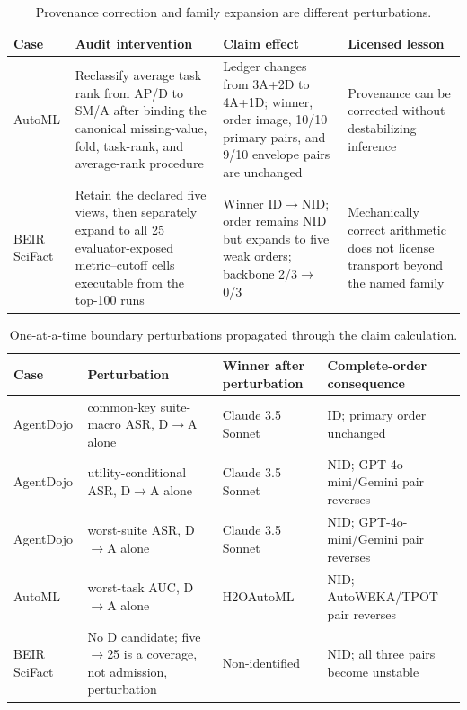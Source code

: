 \begin{table}[ht]
\centering
\caption{Provenance correction and family expansion are different perturbations.}
\label{tab:automl-beir-contrast}
\footnotesize
\begin{tabularx}{\linewidth}{@{}p{.13\linewidth}p{.31\linewidth}p{.25\linewidth}Y@{}}
\toprule Case & Audit intervention & Claim effect & Licensed lesson \\
\midrule
AutoML & Reclassify average task rank from AP/D to SM/A after binding the canonical missing-value, fold, task-rank, and average-rank procedure & Ledger changes from 3A+2D to 4A+1D; winner, order image, 10/10 primary pairs, and 9/10 envelope pairs are unchanged & Provenance can be corrected without destabilizing inference \\
BEIR SciFact & Retain the declared five views, then separately expand to all 25 evaluator-exposed metric--cutoff cells executable from the top-100 runs & Winner ID\(\to\)NID; order remains NID but expands to five weak orders; backbone 2/3\(\to\)0/3 & Mechanically correct arithmetic does not license transport beyond the named family \\
\bottomrule
\end{tabularx}
\end{table}

\begin{table}[ht]
\centering
\caption{One-at-a-time boundary perturbations propagated through the claim calculation.}
\label{tab:admission-perturbations}
\footnotesize
\begin{tabularx}{\linewidth}{@{}p{.15\linewidth}p{.31\linewidth}p{.18\linewidth}Y@{}}
\toprule Case & Perturbation & Winner after perturbation & Complete-order consequence \\
\midrule
AgentDojo & common-key suite-macro ASR, D\(\to\)A alone & Claude 3.5 Sonnet & ID; primary order unchanged \\
AgentDojo & utility-conditional ASR, D\(\to\)A alone & Claude 3.5 Sonnet & NID; GPT-4o-mini/Gemini pair reverses \\
AgentDojo & worst-suite ASR, D\(\to\)A alone & Claude 3.5 Sonnet & NID; GPT-4o-mini/Gemini pair reverses \\
AutoML & worst-task AUC, D\(\to\)A alone & H2OAutoML & NID; AutoWEKA/TPOT pair reverses \\
BEIR SciFact & No D candidate; five\(\to\)25 is a coverage, not admission, perturbation & Non-identified & NID; all three pairs become unstable \\
\bottomrule
\end{tabularx}
\end{table}

